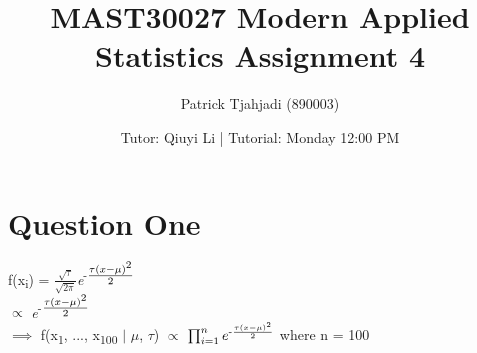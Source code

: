 \documentclass{article}
\title{MAST30027 Modern Applied Statistics Assignment 4}
\author{Patrick Tjahjadi (890003)}
\date{Tutor: Qiuyi Li | Tutorial: Monday 12:00 PM}
\begin{document}
\maketitle

\section{Question One}
f(x\textsubscript{i}) = $\frac{\sqrt{\tau}}{\sqrt{2\pi}}$\textit{e}\textsuperscript{-$\frac{\tau(x-\mu)\textsuperscript{2}}{2}$}\\
$\propto$ \textit{e}\textsuperscript{-$\frac{\tau(x-\mu)\textsuperscript{2}}{2}$}\\
$\implies$  f(x\textsubscript{1}, ..., x\textsubscript{100} $\vert$ $\mu$, $\tau$) $\propto$ $\prod_{i=1}^{n} e\textsuperscript{-$\frac{\tau(x-\mu)\textsuperscript{2}}{2}$}$ where n = 100\\
\end{document}
